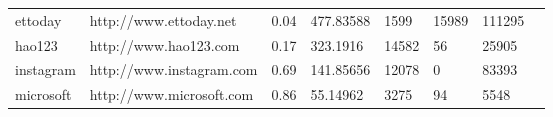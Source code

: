 \begin{table}[]
{\begin{tabular}{llllllll}
ettoday                               & http://www.ettoday.net           & 0.04                                                                                                    & 477.83588                                                                                             & 1599                                                                               & 15989                                                                             & 111295                                                                                   &                                                                                             \\
hao123                                & http://www.hao123.com            & 0.17                                                                                                    & 323.1916                                                                                              & 14582                                                                              & 56                                                                                & 25905                                                                                    &                                                                                             \\
instagram                             & http://www.instagram.com         & 0.69                                                                                                    & 141.85656                                                                                             & 12078                                                                              & 0                                                                                 & 83393                                                                                    &                                                                                             \\
microsoft                             & http://www.microsoft.com         & 0.86                                                                                                    & 55.14962                                                                                              & 3275                                                                               & 94                                                                                & 5548                                                                                     &                                                                                             \\

\end{tabular}}
\end{table}
